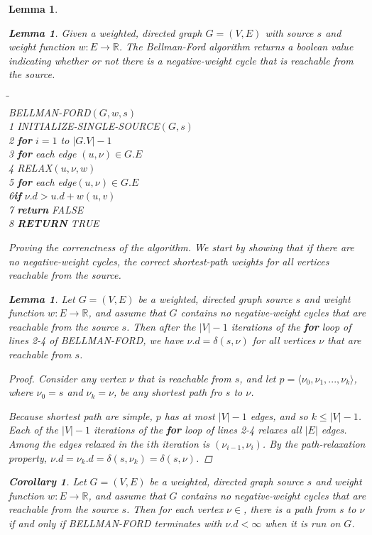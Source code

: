 \documentclass[a4paper,11pt]{book}
\newtheorem{lemma}[theorem]{Lemma}
\newtheorem{corollary}[theorem]{Corollary}
\begin{document}
{\begin{lemma}
\begin{lemma}
Given a weighted, directed graph $G= (V, E)$ with source $s$ and weight function $w : E \rightarrow \mathbb{R}$. The Bellman-Ford algorithm returns a boolean value indicating whether or not there is a negative-weight cycle that is reachable from the source. 
\begin{tabbing}
\hspace{.8cm}\=\hspace{.8cm}\=\hspace{.8cm}\=\\
BELLMAN-FORD$(G,w,s)$\\
1 \>INITIALIZE-SINGLE-SOURCE$(G,s)$\\
2 \>\textbf{for} $i=1$ to $|G.V|-1$\\
3 \>\>\textbf{for} each edge $(u,\nu)\in G.E$\\
4 \>\>\>RELAX$(u,\nu,w)$\\
5\> \textbf{for} each edge$(u,\nu)\in G.E$\\
6\>\>\textbf{if} $\nu.d>u.d+w(u,v)$\\
7 \>\>\>\textbf{return} FALSE\\
8 \> \textbf{RETURN} TRUE
\end{tabbing}
Proving the correnctness of the algorithm. We start by showing that if there are no negative-weight cycles, the correct shortest-path weights for all vertices reachable from the source.

\begin{lemma} Let $G=(V,E)$ be a weighted, directed graph source $s$ and weight function $w : E\rightarrow \mathbb{R}$, and assume that $G$ contains no negative-weight cycles that are reachable from the source $s$. Then after the $|V|-1$ iterations of the \textbf{for} loop of lines 2-4 of BELLMAN-FORD, we have $\nu.d = \delta(s,\nu)$ for all vertices $\nu$ that are reachable from $s$.
\end{lemma}
\begin{proof}
Consider any vertex $\nu$ that is reachable from $s$, and let $p = \langle \nu_0, \nu_1, ...,\nu_k\rangle$, where $\nu_0 =s$ and $\nu_k =\nu$, be any shortest path fro $s$ to $\nu$.

Because shortest path are simple, $p$ has at most $|V|-1$ edges, and so $k\leq|V|-1$. Each of the $|V|-1$ iterations of the \textbf{for} loop of lines 2-4 relaxes all $|E|$ edges. Among the edges relaxed in the $i$th iteration is $(\nu_{i-1}, \nu_i)$. By the path-relaxation property, $\nu.d = \nu_k.d=\delta(s,\nu_k)=\delta(s,\nu)$. 
\end{proof}
\begin{corollary}
Let $G=(V,E)$ be a weighted, directed graph source $s$ and weight function $w : E\rightarrow \mathbb{R}$, and assume that $G$ contains no negative-weight cycles that are reachable from the source $s$. Then for each vertex $\nu \in $, there is a path from $s$ to $\nu$ if and only if BELLMAN-FORD terminates with $\nu.d <\infty$ when it is run on $G$.
\end{corollary}


\end{lemma}
\end{lemma}}
\end{document}
